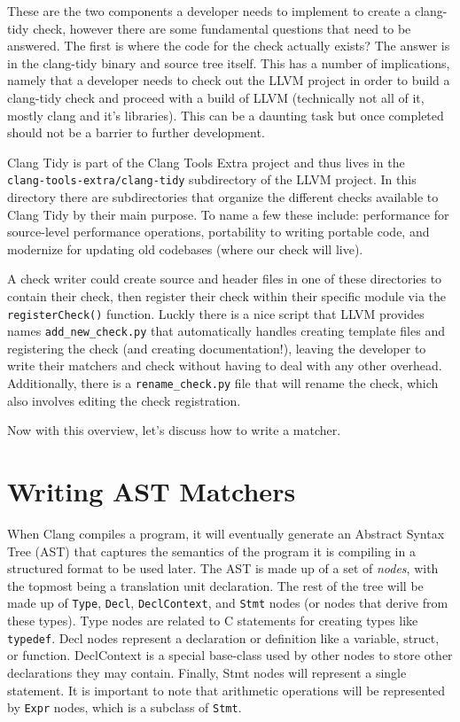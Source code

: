 These are the two components a developer needs to implement to create a clang-tidy check, however there are some fundamental questions that need to be answered. The first is where the code for the check actually exists? The answer is in the clang-tidy binary and source tree itself. This has a number of implications, namely that a developer needs to check out the LLVM project in order to build a clang-tidy check and proceed with a build of LLVM (technically not all of it, mostly clang and it's libraries). This can be a daunting task but once completed should not be a barrier to further development. 

Clang Tidy is part of the Clang Tools Extra project and thus lives in the \\ \texttt{clang-tools-extra/clang-tidy} subdirectory of the LLVM project. In this directory there are subdirectories that organize the different checks available to Clang Tidy by their main purpose. To name a few these include: performance for source-level performance operations, portability to writing portable code, and modernize for updating old codebases (where our check will live).

A check writer could create source and header files in one of these directories to contain their check, then register their check within their specific module via the \texttt{registerCheck()} function. Luckly there is a nice script that LLVM provides names \texttt{add\_new\_check.py} that automatically handles creating template files and registering the check (and creating documentation!), leaving the developer to write their matchers and check without having to deal with any other overhead. Additionally, there is a \texttt{rename\_check.py} file that will rename the check, which also involves editing the check registration.

Now with this overview, let's discuss how to write a matcher.

\section{Writing AST Matchers}

When Clang compiles a program, it will eventually generate an Abstract Syntax Tree (AST) that captures the semantics of the program it is compiling in a structured format to be used later. The AST is made up of a set of \textit{nodes}, with the topmost being a translation unit declaration. The rest of the tree will be made up of \texttt{Type}, \texttt{Decl}, \texttt{DeclContext}, and \texttt{Stmt} nodes (or nodes that derive from these types). Type nodes are related to C statements for creating types like \texttt{typedef}. Decl nodes represent a declaration or definition like a variable, struct, or function. DeclContext is a special base-class used by other nodes to store other declarations they may contain. Finally, Stmt nodes will represent a single statement. It is important to note that arithmetic operations will be represented by \texttt{Expr} nodes, which is a subclass of \texttt{Stmt}.

